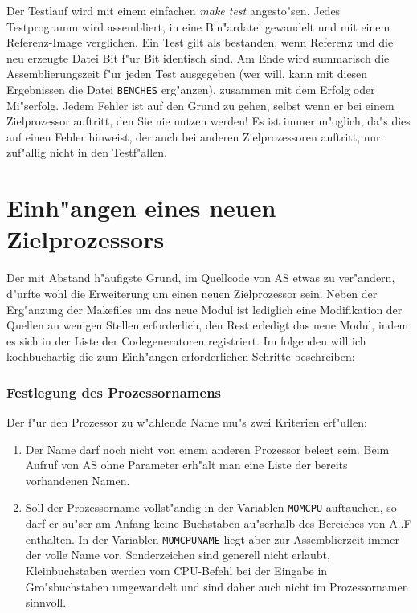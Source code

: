 \documentclass[12pt,a4paper,twoside]{report}
\newcommand{\tty}[1]{{\tt #1}}
\newcommand{\asname}{AS}
\begin{document}
Der Testlauf wird mit einem einfachen {\em make test} angesto"sen.  Jedes
Testprogramm wird assembliert, in eine Bin"ardatei gewandelt und mit einem
Referenz-Image verglichen.  Ein Test gilt als bestanden, wenn Referenz und
die neu erzeugte Datei Bit f"ur Bit identisch sind.  Am Ende wird
summarisch die Assemblierungszeit f"ur jeden Test ausgegeben (wer will,
kann mit diesen Ergebnissen die Datei {\tt BENCHES} erg"anzen), zusammen
mit dem Erfolg oder Mi"serfolg.  Jedem Fehler ist auf den Grund zu gehen,
selbst wenn er bei einem Zielprozessor auftritt, den Sie nie nutzen
werden!  Es ist immer m"oglich, da"s dies auf einen Fehler hinweist, der
auch bei anderen Zielprozessoren auftritt, nur zuf"allig nicht in den
Testf"allen.


\section{Einh"angen eines neuen Zielprozessors}

Der mit Abstand h"aufigste Grund, im Quellcode von \asname{} etwas zu ver"andern,
d"urfte wohl die Erweiterung um einen neuen Zielprozessor sein.  Neben der
Erg"anzung der Makefiles um das neue Modul ist lediglich eine Modifikation
der Quellen an wenigen Stellen erforderlich, den Rest erledigt das neue
Modul, indem es sich in der Liste der Codegeneratoren registriert.  Im
folgenden will ich kochbuchartig die zum Einh"angen erforderlichen
Schritte beschreiben:

\subsubsection{Festlegung des Prozessornamens}

Der f"ur den Prozessor zu w"ahlende Name mu"s zwei Kriterien erf"ullen:
\begin{enumerate}
\item{Der Name darf noch nicht von einem anderen Prozessor belegt sein.
      Beim Aufruf von \asname{} ohne Parameter erh"alt man eine Liste der bereits
      vorhandenen Namen.}
\item{Soll der Prozessorname vollst"andig in der Variablen \tty{MOMCPU}
      auftauchen, so darf er au"ser am Anfang keine Buchstaben au"serhalb
      des Bereiches von A..F enthalten.  In der Variablen \tty{MOMCPUNAME}
      liegt aber zur Assemblierzeit immer der volle Name vor.
      Sonderzeichen sind generell nicht erlaubt, Kleinbuchstaben
      werden vom CPU-Befehl bei der Eingabe in Gro"sbuchstaben umgewandelt
      und sind daher auch nicht im Prozessornamen sinnvoll.}
\end{enumerate}
\end{document}
